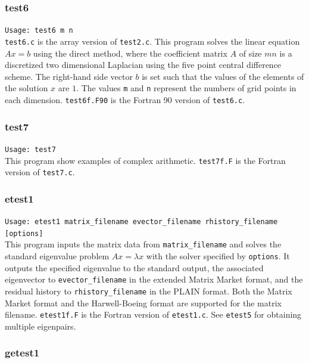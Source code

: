 \documentclass[a4paper]{article}
\begin{document}
\subsubsection{test6}

\verb+Usage: test6 m n+\\

{\tt test6.c} is the array version of {\tt test2.c}.
This program solves the linear equation $Ax = b$ using the direct method,
where the coefficient 
matrix $A$ of size $mn$ is a discretized two dimensional 
Laplacian using the five
point central difference scheme. 
The right-hand side vector $b$ is set such that the values of the elements
of the solution $x$ are $1$. 
The values {\tt m} and  {\tt n} represent the numbers of grid points
in each dimension. 
{\tt test6f.F90} is the Fortran 90 version of {\tt test6.c}.

\subsubsection{test7}

\verb+Usage: test7+\\

This program show examples of complex arithmetic.
{\tt test7f.F} is the Fortran version of {\tt test7.c}.

\subsubsection{etest1}

\verb+Usage: etest1 matrix_filename evector_filename rhistory_filename [options]+\\

This program inputs the matrix data from {\tt matrix\_filename} and
solves the standard eigenvalue problem $Ax=\lambda x$ with 
the solver specified by {\tt options}. 
It outputs the specified eigenvalue to the standard output, 
the associated eigenvector to {\tt evector\_filename} 
in the extended Matrix Market format, and 
the residual history to {\tt rhistory\_filename} 
in the PLAIN format.
Both the Matrix Market format and the Harwell-Boeing format are
supported for the matrix filename. 
{\tt etest1f.F} is the Fortran version of {\tt etest1.c}.
See {\tt etest5} for obtaining multiple eigenpairs.

\subsubsection{getest1}
\end{document}
